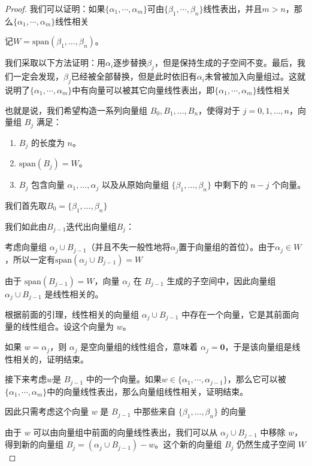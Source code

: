 \documentclass[12pt, a4paper, oneside, UTF8]{ctexbook}
\begin{document}
\begin{para}{0}
\begin{proof}
						我们可以证明：如果$\{\alpha_1,\cdots,\alpha_m\}$可由$\{\beta_1,\cdots,\beta_n\}$线性表出，并且$m > n$，那么$\{\alpha_1,\cdots,\alpha_m\}$线性相关

						记$W=\text{span}(\beta _1, \dots, \beta _n)$。

						我们采取以下方法证明：用$\alpha_i$逐步替换$\beta_j$，但是保持生成的子空间不变。最后，我们一定会发现，$\beta_j$已经被全部替换，但是此时依旧有$\alpha_i$未曾被加入向量组过。这就说明了$\{\alpha_1,\cdots,\alpha_m\}$中有向量可以被其它向量线性表出，即$\{\alpha_1,\cdots,\alpha_m\}$线性相关
						
						也就是说，我们希望构造一系列向量组 $B_0, B_1, \dots, B_n$，使得对于 $j=0, 1, \dots, n$，向量组 $B_j$ 满足：
						\begin{enumerate}
							\item $B_j$ 的长度为 $n$。
							\item $\text{span}(B_j) = W$。
							\item $B_j$ 包含向量 $\alpha _1, \dots, \alpha _j$ 以及从原始向量组 $\{\beta _1, \dots, \beta _n\}$ 中剩下的 $n-j$ 个向量。
						\end{enumerate}
						
						我们首先取$B_0 = \{\beta _1, \dots, \beta _n\}$

						我们如此由$B_{j-1}$迭代出向量组$B_j$：

						考虑向量组 $\alpha_j \cup B_{j-1}$（并且不失一般性地将$\alpha_j$置于向量组的首位）。由于$\alpha_j \in W$，所以一定有$\text{span}(\alpha_j \cup B_{j-1})=W$
						
						由于 $\text{span}(B_{j-1})=W$，向量 $\alpha _j$ 在 $B_{j-1}$ 生成的子空间中，因此向量组 $\alpha _j\cup B_{j-1}$ 是线性相关的。

						根据前面的引理，线性相关的向量组 $\alpha_j\cup B_{j-1}$ 中存在一个向量，它是其前面向量的线性组合。设这个向量为 $w$。
						
						如果 $w = \alpha_j$，则 $\alpha_j$ 是空向量组的线性组合，意味着 $\alpha_j = \mathbf{0}$，于是该向量组是线性相关的，证明结束。

						接下来考虑$w$是 $B_{j-1}$ 中的一个向量。如果$w \in \{\alpha_1,\cdots,\alpha_{j-1}\}$，那么它可以被$\{\alpha_1,\cdots,\alpha_m\}$中的向量线性表出，那么向量组线性相关，证明结束。

						因此只需考虑这个向量 $w$ 是 $B_{j-1}$ 中那些来自 $\{\beta _1, \dots, \beta _n\}$ 的向量

						由于 $w$ 可以由向量组中前面的向量线性表出，我们可以从 $\alpha_j \cup B_{j-1}$ 中移除 $w$，得到新的向量组 $B_j = (\alpha_j \cup B_{j-1})-w$。这个新的向量组 $B_j$ 仍然生成子空间 $W$
						

\end{proof}
\end{para}
\end{document}
